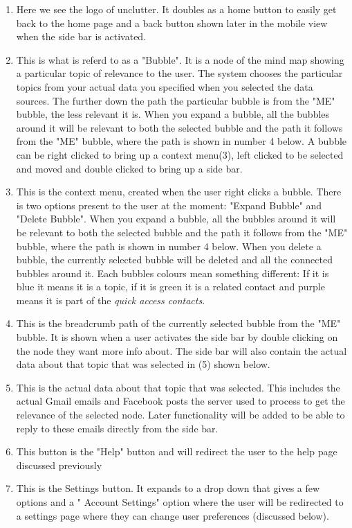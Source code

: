 \documentclass[hidelinks,english]{article}
\begin{document}
    \begin{enumerate}  
        \item Here we see the logo of unclutter. It doubles as a home button to easily get back to the home page and a back button shown later in the mobile view when the side bar is activated.
        \item This is what is referd to as a "Bubble". It is a node of the mind map showing a particular topic of relevance to the user. The system chooses the particular topics from your actual data you specified when you selected the data sources. The further down the path the particular bubble is from the "ME" bubble, the less relevant it is. When you expand a bubble, all the bubbles around it will be relevant to both the selected bubble and the path it follows from the "ME" bubble, where the path is shown in number 4 below. A bubble can be right clicked to bring up a context menu(3), left clicked to be selected and moved and double clicked to bring up a side bar.
        \item This is the context menu, created when the user right clicks a bubble. There is two options present to the user at the moment: "Expand Bubble" and "Delete Bubble". When you expand a bubble, all the bubbles around it will be relevant to both the selected bubble and the path it follows from the "ME" bubble, where the path is shown in number 4 below. When you delete a bubble, the currently selected bubble will be deleted and all the connected bubbles around it. Each bubbles colours mean something different: If it is blue it means it is a topic, if it is green it is a related contact and purple means it is part of the \textit{quick access contacts}.
        \item This is the breadcrumb path of the currently selected bubble from the "ME" bubble. It is shown when a user activates the side bar by double clicking on the node they want more info about. The side bar will also contain the actual data about that topic that was selected in (5) shown below.
        \item This is the actual data about that topic that was selected. This includes the actual Gmail emails and Facebook posts the server used to process to get the relevance of the selected node. Later functionality will be added to be able to reply to these emails directly from the side bar.
        \item This button is the "Help" button and will redirect the user to the help page discussed previously
        \item This is the Settings button. It expands to a drop down that gives a few options  and a " Account Settings" option where the user will be redirected to a settings page where they can change user preferences (discussed below).

\end{enumerate}
\end{document}
